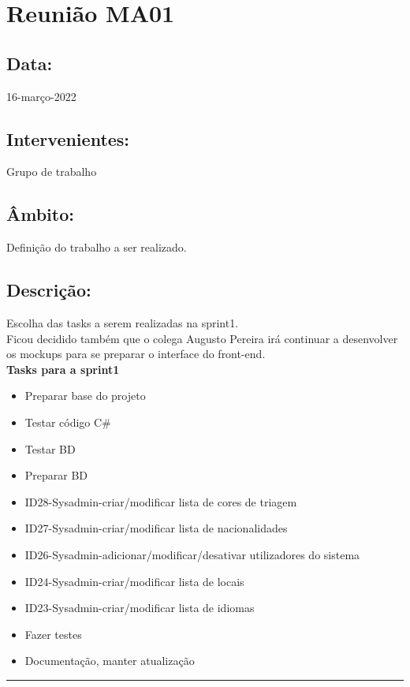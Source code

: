 \section{Reunião MA01}\label{reuniaoMA01}

\subsection*{Data:}
16-março-2022

\subsection*{Intervenientes:}
Grupo de trabalho

\subsection*{Âmbito:}
Definição do trabalho a ser realizado.

\subsection*{Descrição:}
Escolha das tasks a serem realizadas na sprint1. \\

Ficou decidido também que o colega Augusto Pereira irá continuar a desenvolver os mockups para se preparar o interface do front-end. \\


\textbf{Tasks para a sprint1}

\begin{itemize}
	\item Preparar base do projeto
	\item Testar código C\#
	\item Testar BD
	\item Preparar BD
	\item ID28-Sysadmin-criar/modificar lista de cores de triagem
	\item ID27-Sysadmin-criar/modificar lista de nacionalidades
	\item ID26-Sysadmin-adicionar/modificar/desativar utilizadores do sistema
	\item ID24-Sysadmin-criar/modificar lista de locais
	\item ID23-Sysadmin-criar/modificar lista de idiomas
	\item Fazer testes
	\item Documentação, manter atualização
\end{itemize}


\noindent \rule{\linewidth}{0.4pt}
\newline
